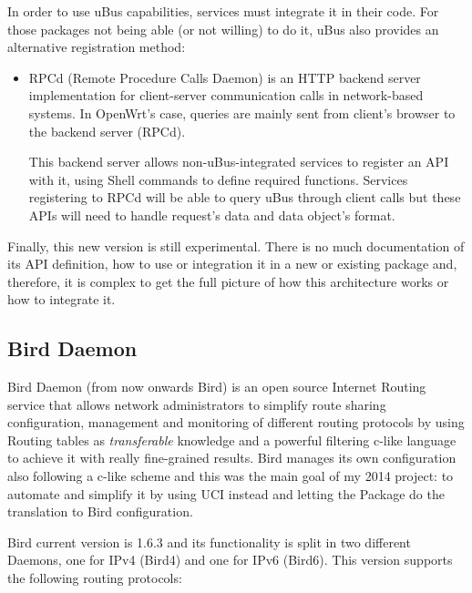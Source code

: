 In order to use uBus capabilities, services must integrate it in their code. For those packages not being able (or not willing) to do it, uBus also provides an alternative registration method:
\begin{itemize}
    \item RPCd (Remote Procedure Calls Daemon) is an HTTP backend server implementation for client-server communication calls in network-based systems. In OpenWrt's case, queries are mainly sent from client's browser to the backend server (RPCd).
    
    This backend server allows non-uBus-integrated services to register an API with it, using Shell commands to define required functions. Services registering to RPCd will be able to query uBus through client calls but these APIs will need to handle request's data and data object's format.
\end{itemize}

Finally, this new version is still experimental. There is no much documentation of its API definition, how to use or integration it in a new or existing package and, therefore, it is complex to get the full picture of how this architecture works or how to integrate it. 

\subsection{Bird Daemon}
Bird Daemon (from now onwards Bird) is an open source Internet Routing service that allows network administrators to simplify route sharing configuration, management and monitoring of different routing protocols by using Routing tables as \textit{transferable} knowledge and a powerful filtering c-like language to achieve it with really fine-grained results. Bird manages its own configuration also following a c-like scheme and this was the main goal of my 2014 project: to automate and simplify it by using UCI instead and letting the Package do the translation to Bird configuration.

Bird current version is 1.6.3 and its functionality is split in two different Daemons, one for IPv4 (Bird4) and one for IPv6 (Bird6). This version supports the following routing protocols:

